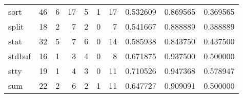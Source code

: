 \begin{tabular}{lrrrrrrrrr}
sort      &                                      46 &                                                  6 &                                                 17 &                                                  5 &                                                  1 &                                                 17 &                                           0.532609 &                               0.869565 &                             0.369565 \\
split     &                                      18 &                                                  2 &                                                  7 &                                                  2 &                                                  0 &                                                  7 &                                           0.541667 &                               0.888889 &                             0.388889 \\
stat      &                                      32 &                                                  5 &                                                  7 &                                                  6 &                                                  0 &                                                 14 &                                           0.585938 &                               0.843750 &                             0.437500 \\
stdbuf    &                                      16 &                                                  1 &                                                  3 &                                                  4 &                                                  0 &                                                  8 &                                           0.671875 &                               0.937500 &                             0.500000 \\
stty      &                                      19 &                                                  1 &                                                  4 &                                                  3 &                                                  0 &                                                 11 &                                           0.710526 &                               0.947368 &                             0.578947 \\
sum       &                                      22 &                                                  2 &                                                  6 &                                                  2 &                                                  1 &                                                 11 &                                           0.647727 &                               0.909091 &                             0.500000 \\

\end{tabular}
